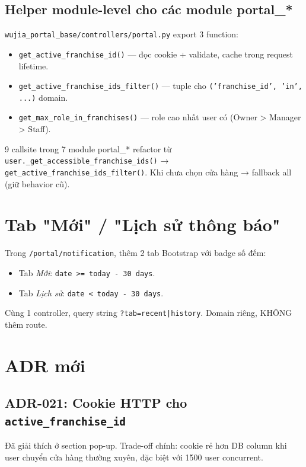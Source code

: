 \subsection{Helper module-level cho các module portal\_*}

\texttt{wujia\_portal\_base/controllers/portal.py} export 3 function:

\begin{itemize}
    \item \texttt{get\_active\_franchise\_id()} --- đọc cookie + validate, cache trong request lifetime.
    \item \texttt{get\_active\_franchise\_ids\_filter()} --- tuple cho \texttt{('franchise\_id', 'in', ...)} domain.
    \item \texttt{get\_max\_role\_in\_franchises()} --- role cao nhất user có (Owner > Manager > Staff).
\end{itemize}

9 callsite trong 7 module portal\_* refactor từ \texttt{user.\_get\_accessible\_franchise\_ids()} → \texttt{get\_active\_franchise\_ids\_filter()}. Khi chưa chọn cửa hàng → fallback all (giữ behavior cũ).

\section{Tab "Mới" / "Lịch sử thông báo"}

Trong \texttt{/portal/notification}, thêm 2 tab Bootstrap với badge số đếm:

\begin{itemize}
    \item Tab \emph{Mới}: \texttt{date >= today - 30 days}.
    \item Tab \emph{Lịch sử}: \texttt{date < today - 30 days}.
\end{itemize}

Cùng 1 controller, query string \texttt{?tab=recent|history}. Domain riêng, KHÔNG thêm route.

\section{ADR mới}

\subsection{ADR-021: Cookie HTTP cho \texttt{active\_franchise\_id}}
Đã giải thích ở section pop-up. Trade-off chính: cookie rẻ hơn DB column khi user chuyển cửa hàng thường xuyên, đặc biệt với 1500 user concurrent.

